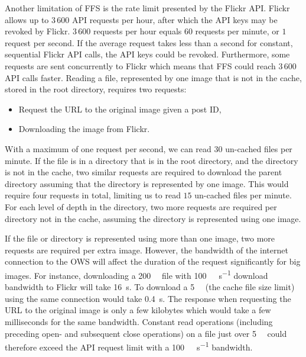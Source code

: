 Another limitation of \gls{FFS} is the rate limit presented by the Flickr \gls{API}. Flickr allows up to $3\,600$ \gls{API} requests per hour, after which the \gls{API} keys may be revoked by Flickr. $3\,600$ requests per hour equals $60$ requests per minute, or $1$ request per second. If the average request takes less than a second for constant, sequential Flickr \gls{API} calls, the \gls{API} keys could be revoked. Furthermore, some requests are sent concurrently to Flickr which means that \gls{FFS} could reach $3\,600$ \gls{API} calls faster. Reading a file, represented by one image that is not in the cache, stored in the root directory, requires two requests:
\begin{itemize}
	\item Request the URL to the original image given a post ID,
	\item Downloading the image from Flickr. 
\end{itemize}
With a maximum of one request per second, we can read $30$ un-cached files per minute. If the file is in a directory that is in the root directory, and the directory is not in the cache, two similar requests are required to download the parent directory assuming that the directory is represented by one image. This would require four requests in total, limiting us to read $15$ un-cached files per minute. For each level of depth in the directory, two more requests are required per directory not in the cache, assuming the directory is represented using one image. 

If the file or directory is represented using more than one image, two more requests are required per extra image. However, the bandwidth of the internet connection to the \gls{OWS} will affect the duration of the request significantly for big images. For instance, downloading a \SI[per-mode = symbol]{200}{\mega\byte} file with \SI[per-mode = symbol]{100}{\mega\bit\per\second} download bandwidth to Flickr will take \SI[per-mode = symbol]{16}{\second}. To download a \SI[per-mode = symbol]{5}{\mega\byte} (the cache file size limit) using the same connection would take \SI[per-mode = symbol]{0.4}{\second}. The response when requesting the URL to the original image is only a few kilobytes which would take a few milliseconds for the same bandwidth. Constant read operations (including preceding open- and subsequent close operations) on a file just over \SI[per-mode = symbol]{5}{\mega\byte} could therefore exceed the \gls{API} request limit with a \SI[per-mode = symbol]{100}{\mega\bit\per\second} bandwidth.


